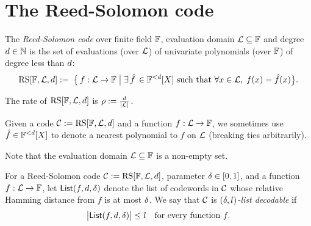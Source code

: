 \chapter{The Reed-Solomon code}


\begin{definition}\label{def:rscode}
\leanok
    The \emph{Reed-Solomon code} over finite field $\mathbb{F}$, evaluation domain $\mathcal{L}\subseteq\mathbb{F}$ and degree $d\in\mathbb{N}$ is the set of evaluations (over $\mathcal{L}$) of univariate polynomials (over $\mathbb{F}$) of degree less than $d$:
    \[
        \mathrm{RS}[\mathbb{F},\mathcal{L},d]:=\; \bigl\{\, f : \mathcal{L} \to \mathbb{F} \;\big|\; \exists \,\hat{f} \,\in \mathbb{F}^{<d}[X]\text{ such that } \forall x \in \mathcal{L},\; f(x) = \hat{f}(x)\bigr\}.
    \]

    The rate of $\mathrm{RS}[\mathbb{F},\mathcal{L},d]$ is $\rho := \frac{d}{\lvert \mathcal{L} \rvert}$.

    Given a code $\mathcal{C} := \mathrm{RS}[\mathbb{F},\mathcal{L},d]$ and a function $f : \mathcal{L} \to \mathbb{F}$, we sometimes use $\hat{f} \in \mathbb{F}^{<d}[X]$ to denote a nearest polynomial to $f$ on $\mathcal{L}$ (breaking ties arbitrarily).
\end{definition}

\begin{remark}
Note that the evaluation domain $\mathcal{L}\subseteq\mathbb{F}$ is a non-empty set.
\end{remark}

\begin{definition}\label{def:list_decodable}
{}
    For a Reed-Solomon code $\mathcal{C} := \mathrm{RS}[\mathbb{F},\mathcal{L},d]$, parameter $\delta \in [0,1]$, 
    and a function $f:\mathcal{L}\to\mathbb{F}$, let $\mathsf{List}(f,d,\delta)$ denote the list 
    of codewords in $\mathcal{C}$ whose relative Hamming distance from $f$ is at most $\delta$.
    We say that $\mathcal{C}$ is \emph{$(\delta,l)$-list decodable} if 
    \[
    \bigl|\mathsf{List}(f,d,\delta)\bigr| \leq l
    \quad
    \text{for every function } f.
    \]
\end{definition}
    
